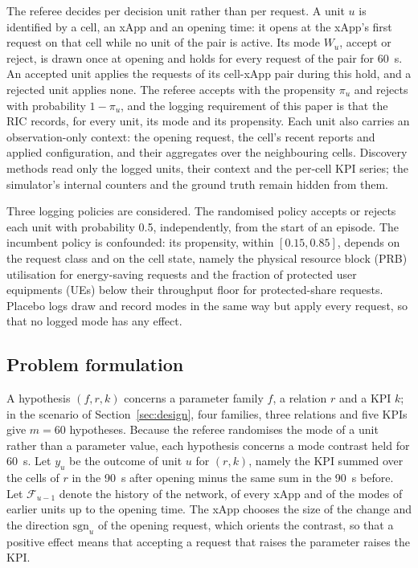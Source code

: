 The referee decides per decision unit rather than per request. A unit $u$ is identified by a cell, an xApp and an
opening time: it opens at the xApp's first request on that cell while no unit of the pair is active. Its mode
$W_u$, accept or reject, is drawn once at opening and holds for every request of the pair for 60~s. An accepted unit
applies the requests of its cell-xApp pair during this hold, and a rejected unit applies none. The referee accepts with
the propensity $\pi_u$ and rejects with probability $1 - \pi_u$, and the logging requirement of this paper is that the
RIC records, for every unit, its mode and its propensity. Each unit also carries an observation-only context: the
opening request, the cell's recent reports and applied configuration, and their aggregates over the neighbouring
cells. Discovery methods read only the logged units, their context and the per-cell KPI series; the simulator's
internal counters and the ground truth remain hidden from them.

Three logging policies are considered. The randomised policy accepts or rejects each unit with probability 0.5,
independently, from the start of an episode. The incumbent policy is confounded: its propensity, within
$[0.15, 0.85]$, depends on the request class and on the cell state, namely the physical resource block (PRB)
utilisation for energy-saving requests and the fraction of protected user equipments (UEs) below their throughput
floor for protected-share requests. Placebo logs draw and record modes in the same way but apply every request, so
that no logged mode has any effect.

\subsection{Problem formulation}
\label{sec:estimand}

A hypothesis $(f, r, k)$ concerns a parameter family $f$, a relation $r$ and a KPI $k$; in the scenario of
Section~\ref{sec:design}, four families, three relations and five KPIs give $m = 60$ hypotheses. Because the referee
randomises the mode of a unit rather than a parameter value, each hypothesis concerns a mode contrast held for 60~s.
Let $y_u$ be the outcome of unit $u$ for $(r, k)$, namely the KPI summed over the cells of $r$ in the 90~s after
opening minus the same sum in the 90~s before. Let $\mathcal{F}_{u-1}$ denote the history of the network, of every xApp and of the
modes of earlier units up to the opening time. The xApp chooses the size of the change and the direction
$\mathrm{sgn}_u$ of the opening request, which orients the contrast, so that a positive effect means that accepting a
request that raises the parameter raises the KPI.

